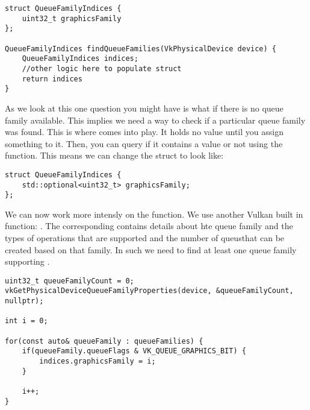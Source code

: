 \begin{center}
    \begin{minipage}{0.95\linewidth}
\begin{lstlisting}
struct QueueFamilyIndices {
    uint32_t graphicsFamily
};   

QueueFamilyIndices findQueueFamilies(VkPhysicalDevice device) {
    QueueFamilyIndices indices;
    //other logic here to populate struct
    return indices
}
\end{lstlisting}
\end{minipage}
\end{center}

\par As we look at this one question you might have is what if there is no queue family available. This implies we need a way to check if a particular queue family was found. This is where  comes into play. It holds no value until you assign something to it. Then, you can query if it contains a value or not using the  function. This means we can change the struct to look like:

\begin{center}
\begin{minipage}{0.95\linewidth}
\begin{lstlisting}
struct QueueFamilyIndices {
    std::optional<uint32_t> graphicsFamily;
};   
\end{lstlisting}
\end{minipage}
\end{center}


\par We can now work more intensly on the  function. We use another Vulkan built in function: . The corresponding  contains details about hte queue family and the types of operations that are supported and the number of queusthat can be created based on that family. In such we need to find at least one queue family supporting .

\begin{center}
\begin{minipage}{0.95\linewidth}
\begin{lstlisting}
uint32_t queueFamilyCount = 0;
vkGetPhysicalDeviceQueueFamilyProperties(device, &queueFamilyCount, nullptr);

int i = 0;

for(const auto& queueFamily : queueFamilies) {
    if(queueFamily.queueFlags & VK_QUEUE_GRAPHICS_BIT) {
        indices.graphicsFamily = i;
    }

    i++;
}
\end{lstlisting}
\end{minipage}
\end{center}

